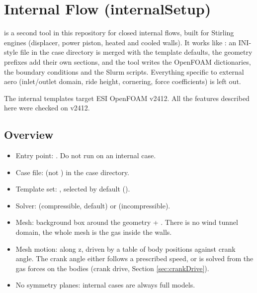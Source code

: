 \section{Internal Flow (internalSetup)}
 is a second tool in this repository for closed internal flows, built for Stirling engines (displacer, power piston, heated and cooled walls). It works like : an INI-style file in the case directory is merged with the template defaults, the geometry prefixes add their own sections, and the tool writes the OpenFOAM dictionaries, the boundary conditions and the Slurm scripts. Everything specific to external aero (inlet/outlet domain, ride height, cornering, force coefficients) is left out.

The internal templates target ESI OpenFOAM v2412. All the features described here were checked on v2412.

\subsection{Overview}
\begin{itemize}
    \item Entry point: . Do not run  on an internal case.
    \item Case file:  (not ) in the case directory.
    \item Template set: , selected by default ().
    \item Solver:  (compressible, default) or  (incompressible).
    \item Mesh:  background box around the geometry + . There is no wind tunnel domain, the whole mesh is the gas inside the walls.
    \item Mesh motion:  along z, driven by a table of body positions against crank angle. The crank angle either follows a prescribed speed, or is solved from the gas forces on the bodies (crank drive, Section \ref{sec:crankDrive}).
    \item No symmetry planes: internal cases are always full models.
\end{itemize}

